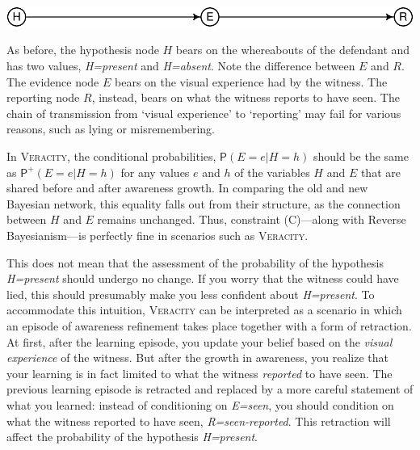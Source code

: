 \documentclass[
  11pt,
  dvipsnames,enabledeprecatedfontcommands]{scrartcl}
\newcommand{\pr}[1]{\ensuremath{\mathsf{P}(#1)}}
\newcommand{\ppr}[2]{\ensuremath{\mathsf{P}^{#1}(#2)}}
\begin{document}
\begin{center}\includegraphics[width=0.5\linewidth,height=0.3\textheight]{ReplyToSteeleStefansson5_files/figure-latex/veracityDAG-1} \end{center}

\noindent As before, the hypothesis node \(H\) bears on the whereabouts
of the defendant and has two values, \textit{H=present} and
\textit{H=absent}. Note the difference between \(E\) and \(R\). The
evidence node \(E\) bears on the visual experience had by the witness.
The reporting node \(R\), instead, bears on what the witness reports to
have seen. The chain of transmission from `visual experience' to
`reporting' may fail for various reasons, such as lying or
misremembering.

In \textsc{Veracity}, the conditional probabilities,
\(\pr{E=e \vert H=h}\) should be the same as \(\ppr{+}{E=e \vert H=h}\)
for any values \(e\) and \(h\) of the variables \(H\) and \(E\) that are
shared before and after awareness growth. In comparing the old and new
Bayesian network, this equality falls out from their structure, as the
connection between \(H\) and \(E\) remains unchanged. Thus, constraint
(C)---along with Reverse Bayesianism---is perfectly fine in scenarios
such as \textsc{Veracity}.

This does not mean that the assessment of the probability of the
hypothesis \textit{H=present} should undergo no change. If you worry
that the witness could have lied, this should presumably make you less
confident about \textit{H=present}. To accommodate this intuition,
\textsc{Veracity} can be interpreted as a scenario in which an episode
of awareness refinement takes place together with a form of retraction.
At first, after the learning episode, you update your belief based on
the \textit{visual experience} of the witness. But after the growth in
awareness, you realize that your learning is in fact limited to what the
witness \textit{reported} to have seen. The previous learning episode is
retracted and replaced by a more careful statement of what you learned:
instead of conditioning on \textit{E=seen}, you should condition on what
the witness reported to have seen, \textit{R=seen-reported}. This
retraction will affect the probability of the hypothesis
\textit{H=present}.
\end{document}
